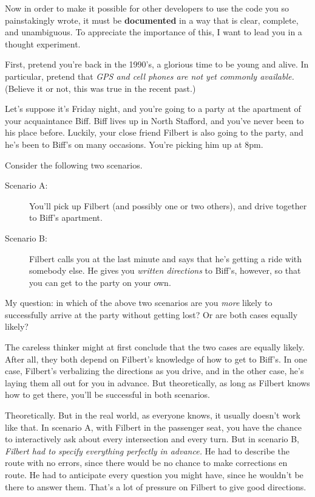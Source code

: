 Now in order to make it possible for other developers to use the code you so
painstakingly wrote, it must be \textbf{documented} in a way that is clear,
complete, and unambiguous. To appreciate the importance of this, I want to
lead you in a thought experiment.

First, pretend you're back in the 1990's, a glorious time to be young and
alive. In particular, pretend that \textit{GPS and cell phones are not yet
commonly available.} (Believe it or not, this was true in the recent past.)

Let's suppose it's Friday night, and you're going to a party at the apartment
of your acquaintance Biff. Biff lives up in North Stafford, and you've never
been to his place before. Luckily, your close friend Filbert is also going to
the party, and he's been to Biff's on many occasions. You're picking him up at
8pm.

Consider the following two scenarios.

\begin{description}

\item[Scenario A:] You'll pick up Filbert (and possibly one or two others), and
drive together to Biff's apartment.

\item[Scenario B:] Filbert calls you at the last minute and says that he's
getting a ride with somebody else. He gives you \textit{written directions} to
Biff's, however, so that you can get to the party on your own.

\end{description}

My question: in which of the above two scenarios are you \textit{more} likely
to successfully arrive at the party without getting lost? Or are both cases
equally likely?

The careless thinker might at first conclude that the two cases are equally
likely. After all, they both depend on Filbert's knowledge of how to get to
Biff's. In one case, Filbert's verbalizing the directions as you drive, and in
the other case, he's laying them all out for you in advance. But
theoretically, as long as Filbert knows how to get there, you'll be successful
in both scenarios.

Theoretically. But in the real world, as everyone knows, it usually doesn't
work like that. In scenario A, with Filbert in the passenger seat, you have the
chance to interactively ask about every intersection and every turn. But in
scenario B, \textit{Filbert had to specify everything perfectly in advance.}
He had to describe the route with no errors, since there would be no chance to
make corrections en route. He had to anticipate every question you might have,
since he wouldn't be there to answer them. That's a lot of pressure on Filbert
to give good directions.

